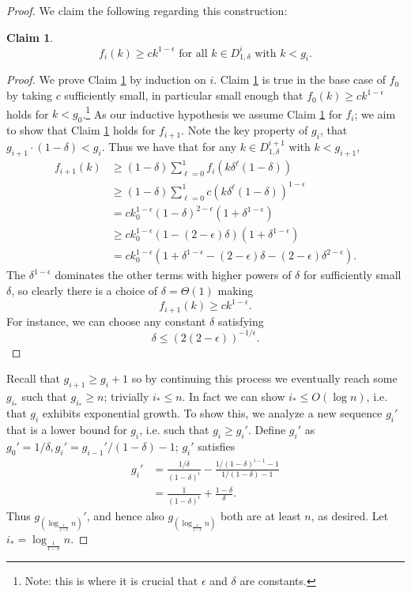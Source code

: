 \documentclass[twocolumn]{article}[10pt]
\newtheorem{clm}{Claim}
\begin{document}
\begin{proof}
  We claim the following regarding this construction:
  \begin{clm}
    \label{clm:fikinduction}
    $$f_i(k) \ge ck^{1-\epsilon} \text{ for all }
    k\in D^i_{1,\delta} \text{ with } k< g_i.$$
  \end{clm}
  \begin{proof}
  We prove Claim \ref{clm:fikinduction} by induction on $i$.
  Claim \ref{clm:fikinduction} is true in the base case of $f_0$
  by taking $c$ sufficiently small, in particular small enough
  that $f_0(k) \ge ck^{1-\epsilon}$ holds for $k <
  g_0$.\footnote{Note: this is where it is crucial that
  $\epsilon$ and $\delta$ are constants.}
  As our inductive hypothesis we assume Claim
  \ref{clm:fikinduction} for $f_i$; we aim to show that Claim
  \ref{clm:fikinduction} holds for $f_{i+1}$. Note the key
  property of $g_i$, that $g_{i+1}\cdot(1-\delta) < g_i$. 
  Thus we have that for any $k\in
  D^{i+1}_{1,\delta}$ with $k<g_{i+1}$,
  \begin{align*}
    f_{i+1}(k) &\ge (1-\delta)\sum_{\ell=0}^1 f_i(k\delta^\ell(1-\delta))\\
    &\ge (1-\delta)\sum_{\ell=0}^1 c (k\delta^\ell(1-\delta))^{1-\epsilon}\\
    &= ck_0^{1-\epsilon} (1-\delta)^{2-\epsilon} (1+\delta^{1-\epsilon})\\
    &\ge ck_0^{1-\epsilon}(1-(2-\epsilon)\delta)(1+\delta^{1-\epsilon})\\
    &= ck_0^{1-\epsilon}(1+\delta^{1-\epsilon}-(2-\epsilon)\delta-(2-\epsilon)\delta^{2-\epsilon}).
  \end{align*}
  The $\delta^{1-\epsilon}$ dominates the other terms with higher
  powers of $\delta$ for sufficiently small $\delta$, so clearly there is a
  choice of $\delta = \Theta(1)$ making $$f_{i+1}(k) \ge
  ck^{1-\epsilon}.$$
  For instance, we can choose any constant $\delta$ satisfying
  $$\delta \le (2(2-\epsilon))^{-1/\epsilon}.$$

  \end{proof}

  Recall that $g_{i+1} \ge g_i + 1$ so by continuing this process
  we eventually reach some $g_{i_*}$ such that $g_{i_*} \ge n$;
  trivially $i_* \le n$. In fact we can show $i_* \le O(\log n)$,
  i.e. that $g_i$ exhibits exponential growth. To show this, we
  analyze a new sequence $g_i'$ that is a lower bound for $g_i$,
  i.e. such that $g_i \ge g_i'$. Define
  $g_i'$ as $g_0'=1/\delta, g_i' = g_{i-1}' / (1-\delta) -1$;
  $g_i'$ satisfies 
  \begin{align*}
    g_i' &= \frac{1/\delta}{(1-\delta)^i} -
    \frac{1/(1-\delta)^{i-1}-1}{1/(1-\delta)-1} \\
        &= \frac{1}{(1-\delta)^i} + \frac{1-\delta}{\delta}.
  \end{align*}
  Thus $g_{(\log_{\frac{1}{1-\delta}} n)}'$, and hence also
  $g_{(\log_{\frac{1}{1-\delta}} n)}$ both are at least $n$, as desired.
  Let $i_* = \log_{\frac{1}{1-\delta}} n.$


\end{proof}
\end{document}
